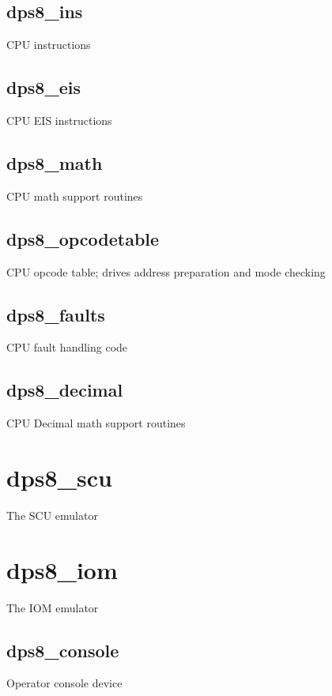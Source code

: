 \documentclass[notitlepage]{report}
\begin{document}
\subsection{dps8\_ins}

CPU instructions

\subsection{dps8\_eis}

CPU EIS instructions

\subsection{dps8\_math}

CPU math support routines

\subsection{dps8\_opcodetable}

CPU opcode table; drives address preparation and mode checking

\subsection{dps8\_faults}

CPU fault handling code

\subsection{dps8\_decimal}

CPU Decimal math support routines

\section{dps8\_scu}

The SCU emulator

\section{dps8\_iom}

The IOM emulator

\subsection{dps8\_console}

Operator console device
\end{document}

